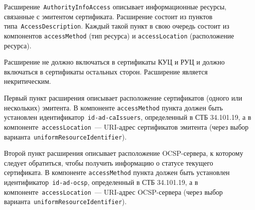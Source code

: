 Расширение~\texttt{AuthorityInfoAccess} описывает информационные ресурсы, 
связанные с эмитентом сертификата.
%
Расширение состоит из пунктов типа~\texttt{AccessDescription}. 
Каждый такой пункт в свою очередь состоит из компонентов 
\texttt{accessMethod} (тип ресурса) и \texttt{accessLocation} 
(расположение ресурса). 

Расширение не должно включаться в сертификаты КУЦ и РУЦ и должно 
включаться в сертификаты остальных сторон. Расширение является 
некритическим. 

Первый пункт расширения описывает расположение сертификатов (одного или нескольких) 
эмитента. В компоненте \texttt{accessMethod} пункта должен быть установлен 
идентификатор~\verb|id-ad-caIssuers|, определенный в СТБ 34.101.19, 
%
а в компоненте~\texttt{accessLocation}~--- URI-адрес сертификатов эмитента
(через выбор варианта~\texttt{uniformResourceIdentifier}).

Второй пункт расширения описывает расположение OCSP-сервера, к которому следует 
обратиться, чтобы получить информацию о статусе текущего сертификата.
В компоненте \texttt{accessMethod} пункта должен быть установлен 
идентификатор~\verb|id-ad-ocsp|, определенный в СТБ 34.101.19,
%
а в компоненте~\texttt{accessLocation}~--- URI-адрес OCSP-сервера
(через выбор варианта~\texttt{uniformResourceIdentifier}).
